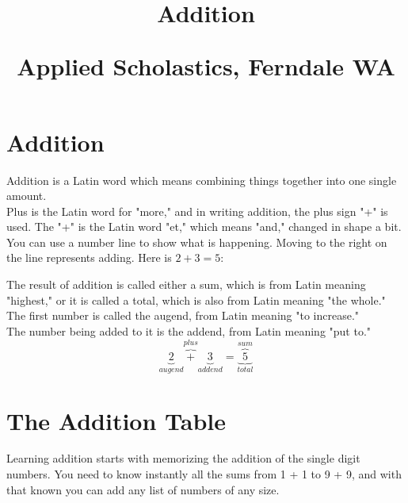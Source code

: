 \documentclass{article}
\author{}
\date{}
\title{Addition\\
\vspace{28pt}
\begin{normalsize}Applied Scholastics, Ferndale WA \end{normalsize}}
\begin{document}
\maketitle
\pagebreak
\tableofcontents
\pagebreak

\section{Addition}
Addition is a Latin word which means combining things together into one single amount.\\

\vspace{32pt}
Plus is the Latin word for "more," and in writing addition, the plus sign "+" is used. The "+" is the Latin word "et," which means "and," changed in shape a bit.\\

\vspace{32pt}
You can use a number line to show what is happening. Moving to the right on the line represents adding. Here is $2+3=5$:\\

\begin{center}
\end{center}

\newpage

\vspace{32pt}
The result of addition is called either a sum, which is from Latin meaning "highest," or it is called a total, which is also from Latin meaning "the whole."\\

The first number is called the augend, from Latin meaning "to increase."\\

The number being added to it is the addend, from Latin meaning "put to."\\

{\huge $$\underbrace{2}_{augend} \overbrace{+}^{plus} \underbrace{3}_{addend} = \underbrace{\overbrace{5}^{sum}}_{total}$$}

\newpage

\section{The Addition Table}
Learning addition starts with memorizing the addition of the single digit numbers. You need to know instantly all the sums from 1 + 1 to 9 + 9, and with that known you can add any list of numbers of any size.\\
\end{document}
